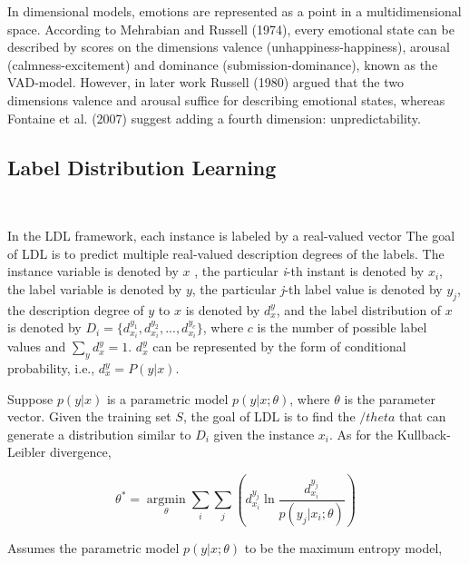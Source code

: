 In dimensional models, 
emotions are represented as a point in a multidimensional space. 
According to Mehrabian and Russell (1974), 
every emotional state can be described by 
scores on the dimensions valence (unhappiness-happiness), 
arousal (calmness-excitement) and dominance (submission-dominance),
known as the VAD-model. 
However, 
in later work Russell (1980) argued that 
the two dimensions valence and arousal suffice 
for describing emotional states, 
whereas Fontaine et al. (2007) suggest adding a fourth dimension: 
unpredictability.



\subsection{Label Distribution Learning}
\

In the LDL framework, 
each instance is labeled by a real-valued vector
The goal of LDL is to 
predict multiple real-valued description degrees of the labels.
The instance variable is denoted by $ x $ , 
the particular \textit{i}-th instant is denoted by $ x_{i} $, 
the label variable is denoted by $ y $,
the particular \textit{j}-th label value is denoted by $ y_{j} $, 
the description degree of $ y $ to $ x $ is denoted by $ d ^ y_{x} $, 
and the label distribution of $ x $ is denoted by 
$  D_{i}  = \{ d^{{y_{1}} }_{ x_{i} }, d^{{y_{2}} }_{ x_{i} },...,d^{{y_{c}} }_{ x_{i} } \} $,
where $ c $ is the number of possible label values
and $ \sum_{y}  d^y_{x} = 1 $.
$ d^y_{x}  $ can be represented by 
the form of conditional probability, i.e., 
$ d^y_{x} =  P (y|x)$. 

Suppose $ p(y|x) $  is a parametric model
$ p(y|x;{\theta}) $, 
where $ \theta $ is the parameter vector. 
Given the training set $ S $, 
the goal of LDL is to find the $ /theta $ that 
can generate a distribution similar to $ D_{i} $
given the instance $ x_{i} $.
As for the Kullback-Leibler divergence,

\begin{equation}\label{eq:kl_divergence}
\theta^{\ast} =
\mathop{\arg\min}\limits_{\theta}
\sum\limits_{i}
\sum\limits_{j}
(d^{y_{j}}_{ x_{ i } }
\ln \dfrac{ d^{y_{j}}_{ x_{ i } } }{ p( y_{ j } | x_{ i } ;{\theta}) })
\end{equation}

Assumes the parametric model 
$ p(y|x;{\theta}) $ 
to be the maximum entropy model,	

